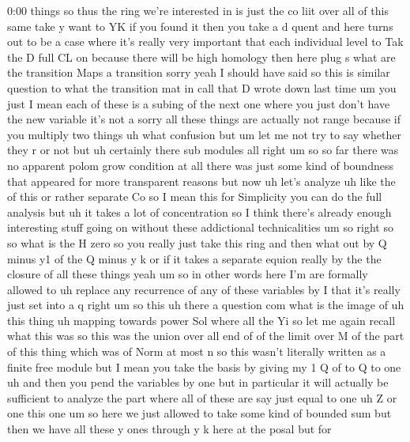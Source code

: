 \begin{unfinished}{0:00}
things
so
thus  the  ring  we're  interested  in  is
just  the  co  liit  over
all  of  this
same  take  y  want  to  YK  if  you  found
it  then  you  take  a  d  quent  and  here
turns  out  to  be  a  case  where  it's
really  very  important  that  each
individual  level  to  Tak  the
D  full  CL  on  because  there  will  be  high
homology
then  here  plug
s  what  are  the  transition  Maps  a
transition  sorry  yeah  I  should  have  said
so  this  is  similar  question  to  what  the
transition  mat  in  call  that  D  wrote  down
last  time  um  you  just  I  mean  each  of
these  is  a  subing  of  the  next  one  where
you  just  don't  have  the  new  variable
it's  not  a  sorry  all  these  things  are
actually  not  range  because  if  you
multiply  two  things
uh
what  confusion  but  um  let  me  not  try  to
say  whether  they  r  or  not  but  uh
certainly  there  sub
modules
all  right  um  so  so  far  there  was  no
apparent  polom  grow  condition  at  all
there  was  just  some  kind  of  boundness
that  appeared  for  more  transparent
reasons  but
now  uh  let's
analyze  uh  like  the  of  this  or  rather
separate
Co
so  I  mean  this  for  Simplicity  you  can  do
the  full  analysis  but
uh  it  takes  a  lot  of  concentration  so  I
think  there's  already  enough  interesting
stuff  going  on  without  these  addictional
technicalities
um
so  right  so  so  what  is  the  H  zero  so  you
really  just  take  this  ring  and  then  what
out  by  Q  minus  y1  of  the  Q  minus  y  k  or
if  it  takes  a  separate  equion  really  by
the  the  closure  of  all  these  things  yeah
um  so  in  other  words  here  I'm  are
formally  allowed  to  uh  replace  any
recurrence  of  any  of  these  variables  by
I  that  it's  really  just  set  into  a  q
right
um  so  this
uh
there  a  question
com  what  is  the
image
of
uh  this
thing  uh  mapping  towards  power
Sol  where  all  the
Yi  so  let  me  again  recall  what  this  was
so  this  was  the  union  over  all  end
of  of  the
limit  over
M
of  the  part  of  this  thing  which  was  of
Norm  at  most
n  so  this  wasn't  literally  written  as  a
finite  free  module  but  I  mean  you  take
the  basis  by  giving  my  1  Q  of  to  Q  to
one  uh  and  then  you  pend  the  variables
by
one  but  in  particular  it  will  actually
be  sufficient  to  analyze  the  part  where
all  of  these  are  say  just  equal  to  one
uh  Z  or  one  this  one  um  so  here  we  just
allowed  to  take  some  kind  of  bounded  sum
but  then  we  have  all  these  y  ones
through  y  k  here  at  the  posal  but  for

\end{unfinished}
